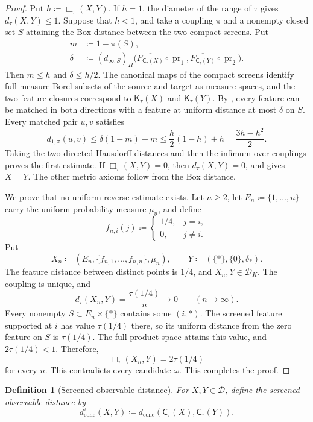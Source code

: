 \documentclass[10pt,a4paper]{amsart}
\newtheorem{definition}[theorem]{Definition}
\newcommand{\D}{\mathcal D}
\newcommand{\DK}{\mathcal D_K}
\newcommand{\Kc}{\mathsf K}
\newcommand{\dconc}{d_{\mathrm{conc}}}
\newcommand{\dtau}{d_{\tau}}
\DeclareMathOperator{\pr}{pr}
\begin{document}
\begin{proof}
Put $h\coloneqq\Box_\tau(X,Y)$. If $h=1$, the diameter of the range of $\tau$ gives $\dtau(X,Y)\leq1$. Suppose that $h<1$, and take a coupling $\pi$ and a nonempty closed set $S$ attaining the Box distance between the two compact screens. Put
\[
\begin{aligned}
m&\coloneqq1-\pi(S),\\
\delta&\coloneqq(d_{\infty,S})_H
\bigl(\overline{F_{\mathsf C_\tau(X)}}\circ\pr_1,
\overline{F_{\mathsf C_\tau(Y)}}\circ\pr_2\bigr).
\end{aligned}
\]
Then $m\leq h$ and $\delta\leq h/2$. The canonical maps of the compact screens identify full-measure Borel subsets of the source and target as measure spaces, and the two feature closures correspond to $\Kc_\tau(X)$ and $\Kc_\tau(Y)$. By , every feature can be matched in both directions with a feature at uniform distance at most $\delta$ on $S$. Every matched pair $u,v$ satisfies
\[
d_{1,\pi}(u,v)
\leq\delta(1-m)+m
\leq\frac h2(1-h)+h
=\frac{3h-h^2}{2}.
\]
Taking the two directed Hausdorff distances and then the infimum over couplings proves the first estimate. If $\Box_\tau(X,Y)=0$, then $\dtau(X,Y)=0$, and  gives $X=Y$. The other metric axioms follow from the Box distance.

We prove that no uniform reverse estimate exists. Let $n\geq2$, let $E_n\coloneqq\{1,\ldots,n\}$ carry the uniform probability measure $\mu_n$, and define
\[
f_{n,i}(j)\coloneqq
\begin{cases}
1/4,&j=i,\\
0,&j\neq i.
\end{cases}
\]
Put
\[
X_n\coloneqq(E_n,\{f_{n,1},\ldots,f_{n,n}\},\mu_n),\qquad
Y\coloneqq(\{*\},\{0\},\delta_*).
\]
The feature distance between distinct points is $1/4$, and $X_n,Y\in\DK$. The coupling is unique, and
\[
\dtau(X_n,Y)=\frac{\tau(1/4)}{n}\longrightarrow0
\qquad(n\to\infty).
\]
Every nonempty $S\subset E_n\times\{*\}$ contains some $(i,*)$. The screened feature supported at $i$ has value $\tau(1/4)$ there, so its uniform distance from the zero feature on $S$ is $\tau(1/4)$. The full product space attains this value, and $2\tau(1/4)<1$. Therefore,
\[
\Box_\tau(X_n,Y)=2\tau(1/4)
\]
for every $n$. This contradicts every candidate $\omega$. This completes the proof.
\end{proof}

\begin{definition}[Screened observable distance]
\label{def:screened-observable-distance}
For $X,Y\in\D$, define the \emph{screened observable distance} by
\[
\dconc^\tau(X,Y)\coloneqq
\dconc(\mathsf C_\tau(X),\mathsf C_\tau(Y)).
\]
\end{definition}
\end{document}
